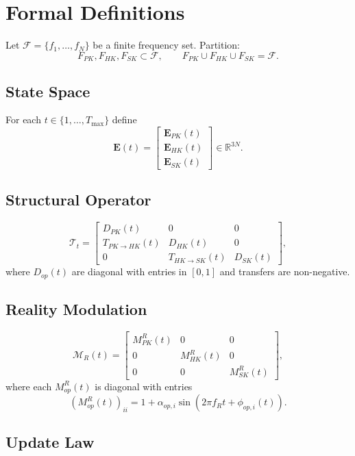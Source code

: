 \documentclass[11pt]{article}
\begin{document}
\section{Formal Definitions}

Let $\mathcal{F}=\{f_1,\dots,f_N\}$ be a finite frequency set. Partition:
\[
F_{PK}, F_{HK}, F_{SK} \subset \mathcal{F}, \qquad
F_{PK}\cup F_{HK}\cup F_{SK}=\mathcal{F}.
\]

\subsection{State Space}

For each $t\in\{1,\dots,T_{\max}\}$ define
\[
\mathbf{E}(t)=
\begin{bmatrix}
\mathbf{E}_{PK}(t)\\
\mathbf{E}_{HK}(t)\\
\mathbf{E}_{SK}(t)
\end{bmatrix}
\in \mathbb{R}^{3N}.
\]

\subsection{Structural Operator}

\[
\mathcal{T}_t=
\begin{bmatrix}
D_{PK}(t) & 0 & 0\\
T_{PK\to HK}(t) & D_{HK}(t) & 0\\
0 & T_{HK\to SK}(t) & D_{SK}(t)
\end{bmatrix},
\]
where $D_{op}(t)$ are diagonal with entries in $[0,1]$ and transfers are 
non-negative.

\subsection{Reality Modulation}

\[
\mathcal{M}_R(t)=
\begin{bmatrix}
M_{PK}^R(t) & 0 & 0\\
0 & M_{HK}^R(t) & 0\\
0 & 0 & M_{SK}^R(t)
\end{bmatrix},
\]
where each $M_{op}^R(t)$ is diagonal with entries
\[
(M_{op}^R(t))_{ii}=1+\alpha_{op,i}\sin(2\pi f_R t+\phi_{op,i}(t)).
\]

\subsection{Update Law}
\end{document}
